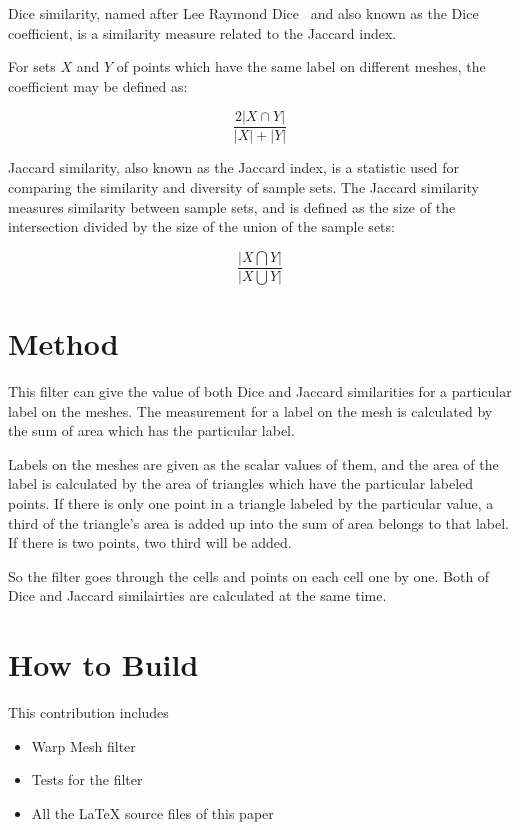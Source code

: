 \documentclass{InsightArticle}
\begin{document}
Dice similarity, named after Lee Raymond Dice~\cite{Dice1945} and also known as the Dice coefficient, 
is a similarity measure related to the Jaccard index.

For sets $X$ and $Y$ of points which have the same label on different meshes, the coefficient
may be defined as: 

\begin{equation}
\frac{2\left | X\cap Y \right |}{\left | X \right |+\left | Y \right |}
\end{equation}

Jaccard similarity, also known as the Jaccard index, is a statistic used for comparing the similarity 
and diversity of sample sets. The Jaccard similarity measures similarity between sample sets, and 
is defined as the size of the intersection divided by the size of the union of the sample sets:

\begin{equation}
\frac{\left | X\bigcap Y \right |}{\left | X\bigcup Y \right |}
\end{equation}

\section{Method}
This filter can give the value of both Dice and Jaccard similarities for a particular label on the meshes.
The measurement for a label on the mesh is calculated by the sum of area which has the particular 
label. 

Labels on the meshes are given as the scalar values of them, and the area of the label is calculated 
by the area of triangles which have the particular labeled points. If there is only one point in a triangle
labeled by the particular value, a third of the triangle's area is added up into the sum of area
belongs to that label. If there is two points, two third will be added.

So the filter goes through the cells and points on each cell one by one. Both of Dice and Jaccard 
similairties are calculated at the same time.
 

\section{How to Build}

This contribution includes

\begin{itemize}
\item Warp Mesh filter
\item Tests for the filter
\item All the LaTeX source files of this paper
\end{itemize}
\end{document}
